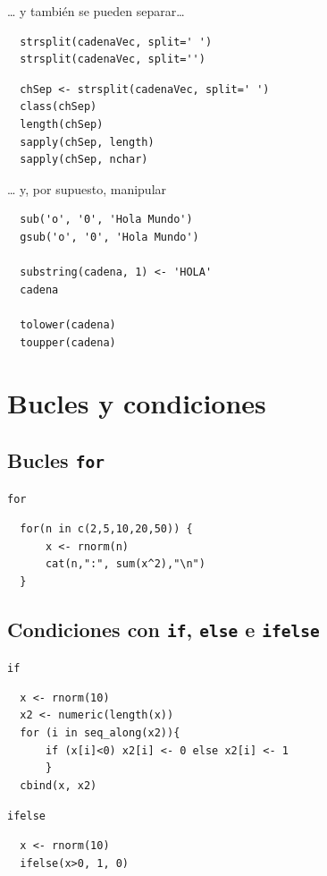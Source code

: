 \documentclass[xcolor={usenames,svgnames,dvipsnames}]{beamer}
\begin{document}
\begin{frame}[fragile,label=sec-5-3-5]{\ldots{} y también se pueden separar\ldots{}}
 \lstset{language=R,label= ,caption= ,numbers=none}
\begin{lstlisting}
  strsplit(cadenaVec, split=' ')
  strsplit(cadenaVec, split='')
\end{lstlisting}

\lstset{language=R,label= ,caption= ,numbers=none}
\begin{lstlisting}
  chSep <- strsplit(cadenaVec, split=' ')
  class(chSep)
  length(chSep)
  sapply(chSep, length)
  sapply(chSep, nchar)
\end{lstlisting}
\end{frame}

\begin{frame}[fragile,label=sec-5-3-6]{\ldots{} y, por supuesto, manipular}
 \lstset{language=R,label= ,caption= ,numbers=none}
\begin{lstlisting}
  sub('o', '0', 'Hola Mundo')
  gsub('o', '0', 'Hola Mundo')
  
  substring(cadena, 1) <- 'HOLA'
  cadena
  
  tolower(cadena)
  toupper(cadena)
\end{lstlisting}
\end{frame}



\section{Bucles y condiciones}
\label{sec-6}
\subsection{Bucles \texttt{for}}
\label{sec-6-1}
\begin{frame}[fragile,label=sec-6-1-1]{\texttt{for}}
 \lstset{language=R,label= ,caption= ,numbers=none}
\begin{lstlisting}
  for(n in c(2,5,10,20,50)) {
      x <- rnorm(n)
      cat(n,":", sum(x^2),"\n")
  }
\end{lstlisting}
\end{frame}
\subsection{Condiciones con \texttt{if}, \texttt{else} e \texttt{ifelse}}
\label{sec-6-2}
\begin{frame}[fragile,label=sec-6-2-1]{\texttt{if}}
 \lstset{language=R,label= ,caption= ,numbers=none}
\begin{lstlisting}
  x <- rnorm(10)
  x2 <- numeric(length(x))
  for (i in seq_along(x2)){
      if (x[i]<0) x2[i] <- 0 else x2[i] <- 1
      }
  cbind(x, x2)
\end{lstlisting}
\end{frame}
\begin{frame}[fragile,label=sec-6-2-2]{\texttt{ifelse}}
 \lstset{language=R,label= ,caption= ,numbers=none}
\begin{lstlisting}
  x <- rnorm(10)
  ifelse(x>0, 1, 0)
\end{lstlisting}
\end{frame}
\end{document}
